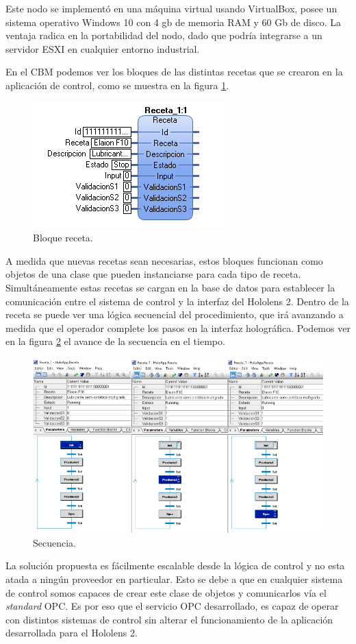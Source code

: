 Este nodo se implementó en una máquina virtual usando VirtualBox, posee un sistema operativo Windows 10 con 4 gb de memoria RAM y 60 Gb de disco. La ventaja radica en la portabilidad del nodo, dado que podría integrarse a un servidor ESXI \citep{esxi} en cualquier entorno industrial. 

En el CBM podemos ver los bloques de las distintas recetas que se crearon en la aplicación de control, como se muestra en la figura \ref{fig:c7}.

\begin{figure}[htpb]
	\centering
	\includegraphics[scale=.6]{./Figures/c7.png}
	\caption{Bloque receta\protect\footnotemark.}
	\label{fig:c7}
\end{figure}

A medida que nuevas recetas sean necesarias, estos bloques funcionan como objetos de una clase que pueden instanciarse para cada tipo de receta. Simultáneamente estas recetas se cargan en la base de datos para establecer la comunicación entre el sistema de control y la interfaz del Hololens 2. Dentro de la receta se puede ver una lógica secuencial del procedimiento, que irá avanzando a medida que el operador complete los pasos en la interfaz holográfica. Podemos ver en la figura \ref{fig:c123} el avance de la secuencia en el tiempo.

\begin{figure}[htpb]
	\centering
	\includegraphics[scale=.5]{./Figures/c123.png}
	\caption{Secuencia\protect\footnotemark.}
	\label{fig:c123}
\end{figure}

La solución propuesta es fácilmente escalable desde la lógica de control y no esta atada a ningún proveedor en particular. Esto se debe a que en cualquier sistema de control somos capaces de crear este clase de objetos y comunicarlos vía el \textit{standard} OPC. Es por eso que el servicio OPC desarrollado, es capaz de operar con distintos sistemas de control sin alterar el funcionamiento de la aplicación desarrollada para el Hololens 2.

